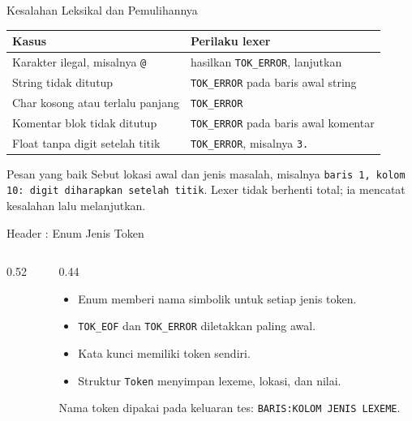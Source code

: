 \documentclass[aspectratio=169,10pt,t]{beamer}
\begin{document}
\begin{frame}{Kesalahan Leksikal dan Pemulihannya}
  \small
  \setlength{\tabcolsep}{4pt}
  \begin{tabular}{@{}p{5.2cm}p{8.6cm}@{}}
    \toprule
    \textbf{Kasus} & \textbf{Perilaku lexer} \\
    \midrule
    Karakter ilegal, misalnya \texttt{@} &
      hasilkan \texttt{TOK\_ERROR}, lanjutkan \\
    String tidak ditutup & \texttt{TOK\_ERROR} pada baris awal string \\
    Char kosong atau terlalu panjang & \texttt{TOK\_ERROR} \\
    Komentar blok tidak ditutup &
      \texttt{TOK\_ERROR} pada baris awal komentar \\
    Float tanpa digit setelah titik & \texttt{TOK\_ERROR}, misalnya \texttt{3.} \\
    \bottomrule
  \end{tabular}

  \vspace{5pt}
  \begin{block}{Pesan yang baik}
    \footnotesize
    Sebut lokasi awal dan jenis masalah, misalnya
    \texttt{baris 1, kolom 10: digit diharapkan setelah titik}.
    Lexer tidak berhenti total; ia mencatat kesalahan lalu melanjutkan.
  \end{block}
\end{frame}

\begin{frame}[fragile]{Header : Enum Jenis Token}
  \begin{columns}[T,onlytextwidth]
    \begin{column}{0.52\textwidth}
      
    \end{column}
    \begin{column}{0.44\textwidth}
      \begin{itemize}
        \item Enum memberi nama simbolik untuk setiap jenis token.
        \item \texttt{TOK\_EOF} dan \texttt{TOK\_ERROR} diletakkan
              paling awal.
        \item Kata kunci memiliki token sendiri.
        \item Struktur \texttt{Token} menyimpan lexeme, lokasi, dan
              nilai.
      \end{itemize}
      \vspace{2pt}
      {\scriptsize\color{ubbblue!75}Nama token dipakai pada keluaran
      tes: \texttt{BARIS:KOLOM JENIS LEXEME}.}
    \end{column}
  \end{columns}
\end{frame}
\end{document}
